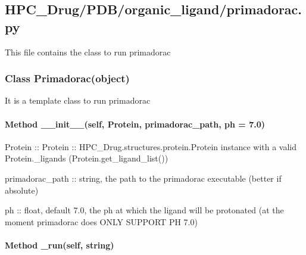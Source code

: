 

\subsection{HPC\_Drug/PDB/organic\_ligand/primadorac.py}

    This file contains the class to run primadorac

    \subsubsection{Class Primadorac(object)}

        It is a template class to run primadorac

        \paragraph{Method \_\_init\_\_(self, Protein, primadorac\_path, ph = 7.0)}

            Protein :: Protein :: HPC\_Drug.structures.protein.Protein instance with a valid Protein.\_ligands (Protein.get\_ligand\_list())

            primadorac\_path :: string, the path to the primadorac executable (better if absolute)

            ph :: float, default 7.0, the ph at which the ligand will be protonated (at the moment primadorac does ONLY SUPPORT PH 7.0)

        \paragraph{Method \_run(self, string)}
        
